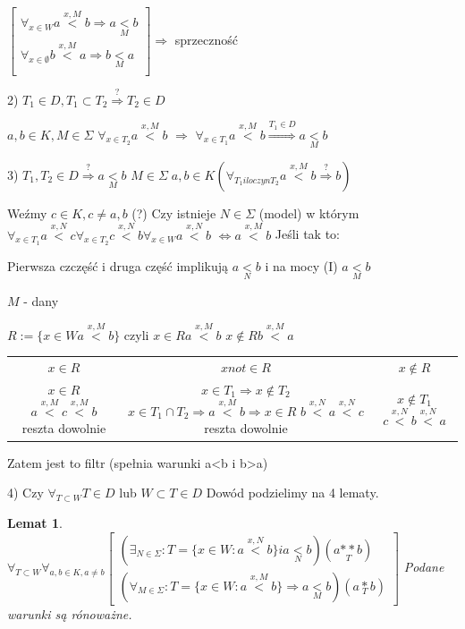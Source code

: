 \documentclass[12pt,a4paper]{article}
\theoremstyle{break}
\newtheorem{lemma}{Lemat}[section]
\newcommand{\witw}{$\Leftrightarrow$}
\begin{document}
	$\begin{bmatrix}
		\forall_{x\in W} a\overset{x,M}{<}b\Rightarrow a\underset{M}{<}b\\
		\forall_{x\in \emptyset} b\overset{x,M}{<}a\Rightarrow b\underset{M}{<}a\\
	\end{bmatrix} \Rightarrow$ sprzeczność
	
	2) $T_1\in D, T_1\subset T_2 \overset{?}{\Rightarrow} T_2 \in D$
	
	$a,b\in K, M\in \Sigma$ $\forall_{x\in T_2} a\overset{x,M}{<}b$ $\Rightarrow$ $\forall_{x\in T_1} a\overset{x,M}{<}b \overset{T_1\in D}{\Rightarrow} a\underset{M}{<}b$
	
	3) $T_1, T_2 \in D \overset{?}{\Rightarrow} a\underset{M}{<}b$ 
	$M\in\Sigma\; a,b\in K (\forall _{T_1iloczyn T_2} a\overset{x,M}{<}b \overset{?}{\Rightarrow}b)$
	
	Weźmy $c\in K, c\neq a,b$
	(?) Czy istnieje $N\in \Sigma$ (model) w którym
	$\forall_{x\in T_1} a\overset{x,N}{<}c \forall_{x\in T_2} c\overset{x,N}{<}b \forall_{x\in W} a\overset{x,N}{<}b$ \witw $a\overset{x,M}{<}b$ Jeśli tak to:
	
	Pierwsza czczęść i druga część implikują $a\underset{N}{<}b$ i na mocy (I) $a\underset{M}{<}b$ 
	
	$M$ - dany
	
	$R:= \{x\in W a\overset{x,M}{<}b\}$ czyli $x\in R a\overset{x,M}{<}b$ $x\notin R b\overset{x,M}{<}a$
	
	\begin{tabular}{|c|c|c|}
	$x\in R$&$xnot\in R$&$x\notin R$\\
	$x\in R$ $a\overset{x,M}{<}c\overset{x,M}{<}b$ reszta dowolnie& $x\in T_1 \Rightarrow x\notin T_2$ $x\in T_1 \cap T_2 \Rightarrow a\overset{x,M}{<}b \Rightarrow x\in R$ $b\overset{x,N}{<}a\overset{x,N}{<}c$ reszta dowolnie& $x\notin T_1$ $c\overset{x,N}{<}b\overset{x,N}{<}a$\\	
	\end{tabular}
	
	Zatem jest to filtr (spełnia warunki a<b i b>a)
	
	4) Czy $\forall_{T\subset W} T\in D$ lub $W\subset T \in D$ 
	Dowód podzielimy na 4 lematy.
	
	\begin{lemma}
		$\forall_{T\subset W} \forall_{a,b\in K, a\neq b} \begin{bmatrix}
			(\exists_{N\in \Sigma} : T=\{x\in W: a\overset{x,N}{<}b\} i a\underset{N}{<}b) (a \underset{T}{**}b)\\
			(\forall_{M\in \Sigma}: T=\{x\in W : a\overset{x,M}{<}b\}\Rightarrow a\underset{M}{<}b) (a\underset{T}{*}b)
		\end{bmatrix}$ Podane warunki są rónoważne.
	\end{lemma}
		
\end{document}
